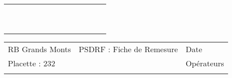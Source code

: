 \documentclass[a4paper, landscape]{article}\usepackage[]{graphicx}\usepackage[]{color}
\begin{document}
{\begin{tabular}{|p{1cm}|p{2cm}|p{1.6cm}|p{1.6cm}|p{1.6cm}|p{1.6cm}|p{1.5cm}|p{1.5cm}|p{1.5cm}|p{1.5cm}|p{1.5cm}|p{7.5cm}|p{5cm}|}
   \hline
 &  &  &  &  &  &  &  &  &  &  &  &  \\ 
   \rowcolor[gray]{0.95} \hline
 &  &  &  &  &  &  &  &  &  &  &  &  \\ 
   \hline
 &  &  &  &  &  &  &  &  &  &  &  &  \\ 
   \rowcolor[gray]{0.95} \hline
 &  &  &  &  &  &  &  &  &  &  &  &  \\ 
   \hline
 &  &  &  &  &  &  &  &  &  &  &  &  \\ 
   \rowcolor[gray]{0.95} \hline
 &  &  &  &  &  &  &  &  &  &  &  &  \\ 
   \hline
 &  &  &  &  &  &  &  &  &  &  &  &  \\ 
   \rowcolor[gray]{0.95} \hline
 &  &  &  &  &  &  &  &  &  &  &  &  \\ 
   \hline
 &  &  &  &  &  &  &  &  &  &  &  &  \\ 
   \rowcolor[gray]{0.95} \hline
 &  &  &  &  &  &  &  &  &  &  &  &  \\ 
   \hline
\end{tabular}
}

\begin{tabular}{p{10cm}p{10cm}p{8cm}}
  RB Grands Monts & PSDRF : Fiche de Remesure & Date \\ 
  Placette : 232 &  & Opérateurs \\ 
   &  &  \\ 
  \end{tabular}
\end{document}
